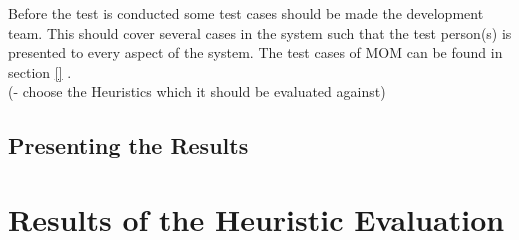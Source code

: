 Before the test is conducted some test cases should be made the development team. This should cover several cases in the system such that the test person(s) is presented to every aspect of the system. The test cases of MOM can be found in section \vref{} . \\


(- choose the Heuristics which it should be evaluated against) 

\subsection{Presenting the Results}



\section{Results of the Heuristic Evaluation}